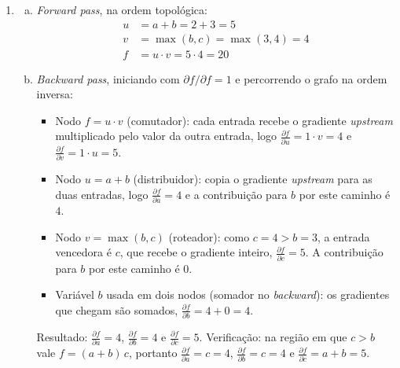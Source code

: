 \documentclass{dlproblemset}
\begin{document}
\begin{enumerate}[1)]
    \item
    \begin{enumerate}[a)]
        \item \textit{Forward pass}, na ordem topológica:
        \begin{align*}
            u &= a + b = 2 + 3 = 5\\
            v &= \max(b, c) = \max(3, 4) = 4\\
            f &= u \cdot v = 5 \cdot 4 = 20
        \end{align*}
        \item \textit{Backward pass}, iniciando com $\partial f/\partial f = 1$ e percorrendo o grafo na ordem inversa:
        \begin{itemize}
            \item Nodo $f = u \cdot v$ (comutador): cada entrada recebe o gradiente \textit{upstream} multiplicado pelo valor da outra entrada, logo $\frac{\partial f}{\partial u} = 1 \cdot v = 4$ e $\frac{\partial f}{\partial v} = 1 \cdot u = 5$.
            \item Nodo $u = a + b$ (distribuidor): copia o gradiente \textit{upstream} para as duas entradas, logo $\frac{\partial f}{\partial a} = 4$ e a contribuição para $b$ por este caminho é $4$.
            \item Nodo $v = \max(b, c)$ (roteador): como $c = 4 > b = 3$, a entrada vencedora é $c$, que recebe o gradiente inteiro, $\frac{\partial f}{\partial c} = 5$. A contribuição para $b$ por este caminho é $0$.
            \item Variável $b$ usada em dois nodos (somador no \textit{backward}): os gradientes que chegam são somados, $\frac{\partial f}{\partial b} = 4 + 0 = 4$.
        \end{itemize}
        Resultado: $\frac{\partial f}{\partial a} = 4$, $\frac{\partial f}{\partial b} = 4$ e $\frac{\partial f}{\partial c} = 5$. Verificação: na região em que $c > b$ vale $f = (a+b)\,c$, portanto $\frac{\partial f}{\partial a} = c = 4$, $\frac{\partial f}{\partial b} = c = 4$ e $\frac{\partial f}{\partial c} = a + b = 5$.
    \end{enumerate}


\end{enumerate}
\end{document}
